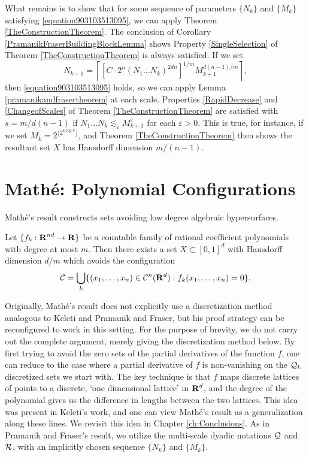 What remains is to show that for some sequence of parameters $\{ N_k \}$ and $\{ M_k \}$ satisfying \eqref{equation903103513095}, we can apply Theorem \ref{TheConstructionTheorem}. The conclusion of Corollary \ref{PramanikFraserBuildingBlockLemma} shows Property \ref{SingleSelection} of Theorem \ref{TheConstructionTheorem} is always satisfied. If we set
%
\[ N_{k+1} = \left\lceil \left[ C \cdot 2^n (N_1 \dots N_k)^{2dn} \right]^{1/m} M_{k+1}^{d(n-1)/m} \right\rceil, \]
%
then \eqref{equation903103513095} holds, so we can apply Lemma \ref{pramanikandfrasertheorem} at each scale. Properties \ref{RapidDecrease} and \ref{ChangeofScales} of Theorem \ref{TheConstructionTheorem} are satisfied with $s = m/d(n-1)$ if $N_1 \dots N_k \lesssim_\varepsilon M_{k+1}^\varepsilon$ for each $\varepsilon > 0$. This is true, for instance, if we set $M_k = 2^{\lfloor 2^{k \log k} \rfloor}$, and Theorem \ref{TheConstructionTheorem} then shows the resultant set $X$ has Hausdorff dimension $m/(n-1)$.

\section{Math\'{e}: Polynomial Configurations}

Math\'{e}'s result \cite{Mathe} constructs sets avoiding low degree algebraic hypersurfaces.

\begin{theorem}[Math\'{e}]
    Let $\{ f_k: \operatorname{\mathbf{R}}^{nd} \to \mathbf{R} \}$ be a countable family of rational coefficient polynomials with degree at most $m$. Then there exists a set $X \subset [0,1]^d$ with Hausdorff dimension $d/m$ which avoids the configuration
    \[ \operatorname{\mathcal{C}} = \bigcup_k \{ (x_1, \dots, x_n) \in \operatorname{\mathcal{C}}^n(\operatorname{\mathbf{R}}^d) : f_k(x_1, \dots, x_n) = 0 \}. \]
\end{theorem}

Originally, Math\'{e}'s result does not explicitly use a discretization method analogous to Keleti and Pramanik and Fraser, but his proof strategy can be reconfigured to work in this setting. For the purpose of brevity, we do not carry out the complete argument, merely giving the discretization method below. By first trying to avoid the zero sets of the partial derivatives of the function $f$, one can reduce to the case where a partial derivative of $f$ is non-vanishing on the $\operatorname{\mathcal{Q}}_k$ discretized sets we start with. The key technique is that $f$ maps discrete lattices of points to a discrete, `one dimensional lattice' in $\operatorname{\mathbf{R}}^d$, and the degree of the polynomial gives us the difference in lengths between the two lattices. This idea was present in Keleti's work, and one can view Math\'{e}'s result as a generalization along these lines. We revisit this idea in Chapter \ref{ch:Conclusions}. As in Pramanik and Fraser's result, we utilize the multi-scale dyadic notations $\operatorname{\mathcal{Q}}$ and $\operatorname{\mathcal{R}}$, with an implicitly chosen sequence $\{ N_k \}$ and $\{ M_k \}$.

